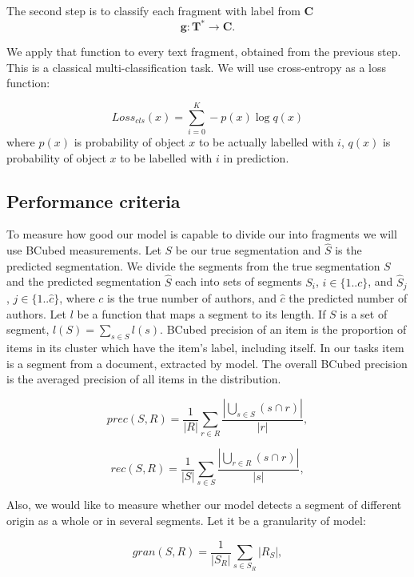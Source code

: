 \documentclass{article}
\begin{document}
The second step is to classify each fragment with label from $\mathbf{C}$
$$\mathbf{g}: \mathbf{T}^* \rightarrow \mathbf{C}.$$

We apply that function to every text fragment, obtained from the previous step. This is a classical multi-classification task. We will use cross-entropy as a loss function:

$$Loss_{cls}(x) = \sum_{i=0}^K-p(x)\log q(x)$$ 
where $p(x)$ is probability of object $x$ to be actually labelled with $i$,
$q(x)$ is  probability of object $x$ to be labelled with $i$  in prediction.

\subsection{Performance criteria}

To measure how good our model is capable to divide our into fragments we will use BCubed\cite{bcubed} measurements.
Let $S$ be our true segmentation and $\hat{S}$  is the predicted segmentation. We divide the segments from the true segmentation $S$ and the predicted segmentation $\hat{S}$ each into sets of segments $S_i$, $i\in\{1..c\}$, and $\hat{S}_j$, $j\in\{1..\hat{c}\}$, where $c$ is the true number of authors, and $\hat{c}$ the predicted number of authors. Let $l$ be a function that maps a segment to its length. If $S$ is a set of segment, $l(S) = \sum_{s \in S}l(s)$. BCubed precision of an item is the proportion of items in its cluster which have the item’s label, including itself. In our tasks item is a segment from a document, extracted by model. The overall BCubed precision is the averaged precision of all items in the distribution.  


$$ prec(S, R) = \frac{1}{|R|}\sum_{r \in R}\frac{|\bigcup_{s \in S}(s \cap r)|}{|r|},$$

$$ rec(S, R) = \frac{1}{|S|}\sum_{s \in S}\frac{|\bigcup_{r \in R}(s \cap r)|}{|s|},$$


Also, we would like to measure whether our model detects a segment of different origin as a whole or in several segments. Let it be a granularity\cite{granularity} of model:

$$ gran(S, R) = \frac{1}{|S_{R}|}\sum_{s \in S_{R}}|R_{S}|,$$
\end{document}
